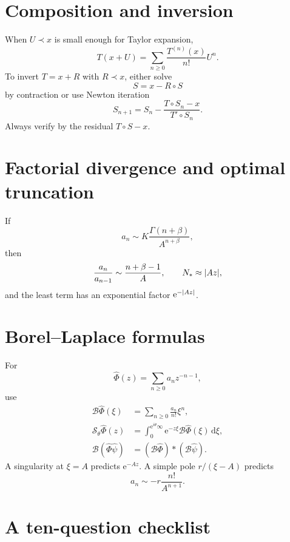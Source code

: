\documentclass[11pt,oneside]{book}
\theoremstyle{definition}
\theoremstyle{remark}
\newcommand{\Borel}{\mathcal{B}}
\newcommand{\e}{\mathrm{e}}
\newcommand{\dd}{\,\mathrm{d}}
\newcommand{\precdom}{\prec}
\newcommand{\compose}{\mathbin{\circ}}
\newcommand{\phihat}{\widehat{\Phi}}
\DeclarePairedDelimiter{\abs}{\lvert}{\rvert}
\begin{document}
\section{Composition and inversion}

When $U\precdom x$ is small enough for Taylor expansion,
\[
  T(x+U)=\sum_{n\ge0}\frac{T^{(n)}(x)}{n!}U^n.
\]
To invert $T=x+R$ with $R\precdom x$, either solve
\[
  S=x-R\compose S
\]
by contraction or use Newton iteration
\[
  S_{n+1}=S_n-\frac{T\compose S_n-x}{T'\compose S_n}.
\]
Always verify by the residual $T\compose S-x$.

\section{Factorial divergence and optimal truncation}

If
\[
  a_n\sim K\frac{\Gamma(n+\beta)}{A^{n+\beta}},
\]
then
\[
  \frac{a_n}{a_{n-1}}\sim\frac{n+\beta-1}{A},
  \qquad N_*\approx\abs{Az},
\]
and the least term has an exponential factor $\e^{-\abs{Az}}$.

\section{Borel--Laplace formulas}

For
\[
  \phihat(z)=\sum_{n\ge0}a_nz^{-n-1},
\]
use
\begin{align*}
  \Borel\phihat(\xi)&=\sum_{n\ge0}\frac{a_n}{n!}\xi^n,\\
  \mathcal S_\theta\phihat(z)
  &=\int_0^{\e^{i\theta}\infty}
    \e^{-z\xi}\Borel\phihat(\xi)\dd\xi,\\
  \Borel(\phihat\widehat\psi)&=
  (\Borel\phihat)*(\Borel\widehat\psi).
\end{align*}
A singularity at $\xi=A$ predicts $\e^{-Az}$. A simple pole
$r/(\xi-A)$ predicts
\[
  a_n\sim-r\frac{n!}{A^{n+1}}.
\]

\section{A ten-question checklist}
\end{document}
